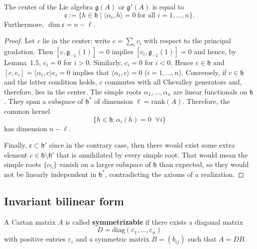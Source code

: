 \documentclass[12pt]{article}
\begin{document}
\begin{proposition}
    The center of the Lie algebra $\mathfrak{g}(A)$ or $\mathfrak{g}'(A)$ is equal to
    \[
        \mathfrak{c} := \{ h \in \mathfrak{h} \mid \langle \alpha_i, h \rangle = 0
        \ \text{for all } i=1,\dots,n \}.
    \]
    Furthermore, $\dim \mathfrak{c} = n-\ell$.
\end{proposition}

\begin{proof}
    Let $c$ lie in the center; write $c = \sum_i c_i$ with respect to the principal
    gradation. Then $[c,\mathfrak{g}_{-1}(1)] = 0$ implies
    $[c_i,\mathfrak{g}_{-1}(1)] = 0$ and hence, by Lemma~1.5, $c_i = 0$ for $i>0$.
    Similarly, $c_i=0$ for $i<0$. Hence $c \in \mathfrak{h}$ and
    $[c,e_i] = \langle \alpha_i,c \rangle e_i = 0$ implies that
    $\langle \alpha_i,c \rangle = 0$ ($i=1,\dots,n$). Conversely, if $c \in \mathfrak{h}$
    and the latter condition holds, $c$ commutes with all Chevalley generators and, therefore, lies in the center. The simple roots $\alpha_1,\dots,\alpha_n$ are linear functionals on $\mathfrak{h}$. They span a subspace of $\mathfrak{h}^*$ of dimension $\ell = \mathrm{rank}(A)$. Therefore, the common kernel
    \[
        \{ h \in \mathfrak{h} : \alpha_i(h)=0 \;\;\forall i\}
    \]
    has dimension $n-\ell$.

    Finally, $\mathfrak{c} \subset \mathfrak{h}'$ since in the contrary case, then there would exist some extra element $c \in \mathfrak{h} \setminus \mathfrak{h}'$ that is annihilated by every simple root. That would mean the simple roots $\{\alpha_i\}$ vanish on a larger subspace of $\mathfrak{h}$ than expected, so they would not be linearly independent in $\mathfrak{h}^*$, contradicting the axioms of a realization.
\end{proof}

\subsection{Invariant bilinear form}
\begin{definition}
    A Cartan matrix $A$ is called \textbf{symmetrizable} if there exists a diagonal matrix \[D = \mathrm{diag}(\varepsilon_1,\dots,\varepsilon_n)\] with positive entries $\varepsilon_i$ and a symmetric matrix $B = (b_{ij})$ such that $A = DB$.
\end{definition}
\end{document}
